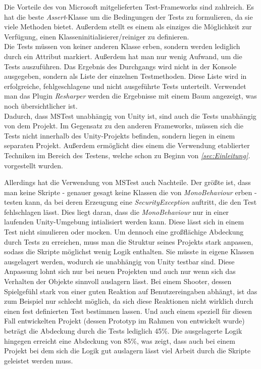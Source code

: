 Die Vorteile des von Microsoft mitgelieferten Test-Frameworks sind zahlreich. Es hat die beste \textit{Assert}-Klasse um die Bedingungen der Tests zu formulieren, da sie viele Methoden bietet. Außerdem stellt es einem als einziges die Möglichkeit zur Verfügung, einen Klasseninitialisierer/reiniger zu definieren.\\
Die Tests müssen von keiner anderen Klasse erben, sondern werden lediglich durch ein Attribut markiert. Außerdem hat man nur wenig Aufwand, um die Tests auszuführen. Das Ergebnis des Durchgangs wird nicht in der Konsole ausgegeben, sondern als Liste der einzelnen Testmethoden. Diese Liste wird in erfolgreiche, fehlgeschlagene und nicht ausgeführte Tests unterteilt. Verwendet man das Plugin \textit{Resharper} werden die Ergebnisse mit einem Baum angezeigt, was noch übersichtlicher ist.\\
Dadurch, dass MSTest unabhängig von Unity ist, sind auch die Tests unabhängig von dem Projekt. Im Gegensatz zu den anderen Frameworks, müssen sich die Tests nicht innerhalb des Unity-Projekts befinden, sondern liegen in einem separaten Projekt. Außerdem ermöglicht dies einem die Verwendung etablierter Techniken im Bereich des Testens, welche schon zu Beginn von \textit{\ref{sec:Einleitung}. } vorgestellt wurden.

Allerdings hat die Verwendung von MSTest auch Nachteile. Der größte ist, dass man keine Skripte - genauer gesagt keine Klassen die von \textit{MonoBehaviour} erben - testen kann, da bei deren Erzeugung eine \textit{SecurityException} auftritt, die den Test fehlschlagen lässt. Dies liegt daran, dass die \textit{MonoBehaviour} nur in einer laufenden Unity-Umgebung intialisiert werden kann. Diese lässt sich in einem Test nicht simulieren oder mocken. Um dennoch eine großflächige Abdeckung durch Tests zu erreichen, muss man die Struktur seines Projekts stark anpassen, sodass die Skripte möglichst wenig Logik enthalten. Sie müsste in eigene Klassen ausgelagert werden, wodurch sie unabhängig von Unity testbar sind. Diese Anpassung lohnt sich nur bei neuen Projekten und auch nur wenn sich das Verhalten der Objekte sinnvoll auslagern lässt. Bei einem Shooter, dessen Spielgefühl stark von einer guten Reaktion auf Benutzereingaben abhängt, ist das zum Beispiel nur schlecht möglich, da sich diese Reaktionen nicht wirklich durch einen fest definierten Test bestimmen lassen. Und auch einem speziell für diesen Fall entwickelten Projekt (dessen Prototyp im Rahmen von \cite{TDGD13} entwickelt wurde) beträgt die Abdeckung durch die Tests lediglich 45\%. Die ausgelagerte Logik hingegen erreicht eine Abdeckung von 85\%, was zeigt, dass auch bei einem Projekt bei dem sich die Logik gut auslagern lässt viel Arbeit durch die Skripte geleistet werden muss.

